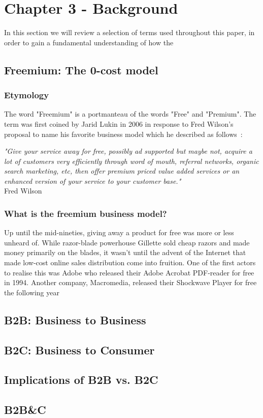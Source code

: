 \chapter{Chapter 3 - Background}
In this section we will review a selection of terms used throughout this paper, in order to gain a fundamental understanding of how the 
\section{Freemium: The 0-cost model}
\subsection {Etymology}
The word "Freemium" is a portmanteau of the words "Free" and "Premium". The term was first coined by Jarid Lukin in 2006 in response to Fred Wilson's proposal to name his favorite business model which he described as follows~\cite{freemiumdef}:
\begin{center}
\textit{"Give your service away for free, possibly ad supported but maybe not,
acquire a lot of customers very efficiently through word of mouth,
referral networks, organic search marketing, etc, then offer premium
priced value added services or an enhanced version of your service to
your customer base."}\\
Fred Wilson
\end{center}
\subsection{What is the freemium business model?}
Up until the mid-nineties, giving away a product for free was more or less unheard of. While razor-blade powerhouse Gillette sold cheap razors and made money primarily on the blades, it wasn't until the advent of the Internet that made low-cost online sales distribution come into fruition. One of the first actors to realise this was Adobe who released their Adobe Acrobat PDF-reader for free in 1994. Another company, Macromedia, released their Shockwave Player for free the following year  
\section{B2B: Business to Business}
\section{B2C: Business to Consumer}
\section{Implications of B2B vs. B2C}
\section{B2B\&C}